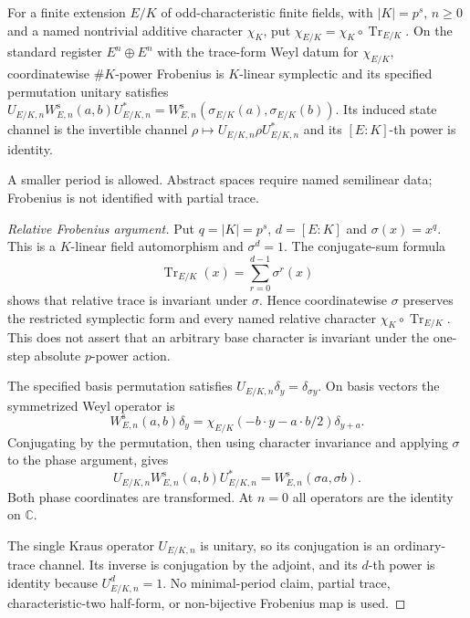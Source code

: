\begin{proposition}
\statusProved{}
For a finite extension $E/K$ of odd-characteristic finite fields, with $\lvert
K\rvert=p^s$, $n\geq0$ and a named nontrivial additive character $\chi_K$, put
$\chi_{E/K}=\chi_K\circ\operatorname{Tr}_{E/K}$. On the standard register $E^n\oplus
E^n$ with the trace-form Weyl datum for $\chi_{E/K}$, coordinatewise $\#K$-power
Frobenius is $K$-linear symplectic and its specified permutation unitary satisfies
$U_{E/K,n}W^{\mathrm s}_{E,n}(a,b)U_{E/K,n}^*=W^{\mathrm
s}_{E,n}(\sigma_{E/K}(a),\sigma_{E/K}(b))$. Its induced state channel is the
invertible channel $\rho\mapsto U_{E/K,n}\rho U_{E/K,n}^*$ and its $[E:K]$-th power
is identity.
\end{proposition}
\begin{scope}
A smaller period is allowed. Abstract spaces require named semilinear data; Frobenius is not identified with partial trace.
\end{scope}

\begin{proof}[Relative Frobenius argument]
Put $q=|K|=p^s$, $d=[E:K]$ and $\sigma(x)=x^q$. This is a $K$-linear field
automorphism and $\sigma^d=1$. The conjugate-sum formula
\[
 \operatorname{Tr}_{E/K}(x)=\sum_{r=0}^{d-1}\sigma^r(x)
\]
shows that relative trace is invariant under $\sigma$. Hence coordinatewise
$\sigma$ preserves the restricted symplectic form and every named relative
character $\chi_K\circ\operatorname{Tr}_{E/K}$. This does not assert that an
arbitrary base character is invariant under the one-step absolute
$p$-power action.

The specified basis permutation satisfies
$U_{E/K,n}\delta_y=\delta_{\sigma y}$. On basis vectors the symmetrized Weyl
operator is
\[
 W^{\mathrm s}_{E,n}(a,b)\delta_y
 =\chi_{E/K}(-b\cdot y-a\cdot b/2)\delta_{y+a}.
\]
Conjugating by the permutation, then using character invariance and applying
$\sigma$ to the phase argument, gives
\[
 U_{E/K,n}W^{\mathrm s}_{E,n}(a,b)U_{E/K,n}^*
 =W^{\mathrm s}_{E,n}(\sigma a,\sigma b).
\]
Both phase coordinates are transformed. At $n=0$ all operators are the
identity on $\mathbb C$.

The single Kraus operator $U_{E/K,n}$ is unitary, so its conjugation is an
ordinary-trace channel. Its inverse is conjugation by the adjoint, and its
$d$-th power is identity because $U_{E/K,n}^d=1$. No minimal-period claim,
partial trace, characteristic-two half-form, or non-bijective Frobenius map
is used.
\end{proof}

